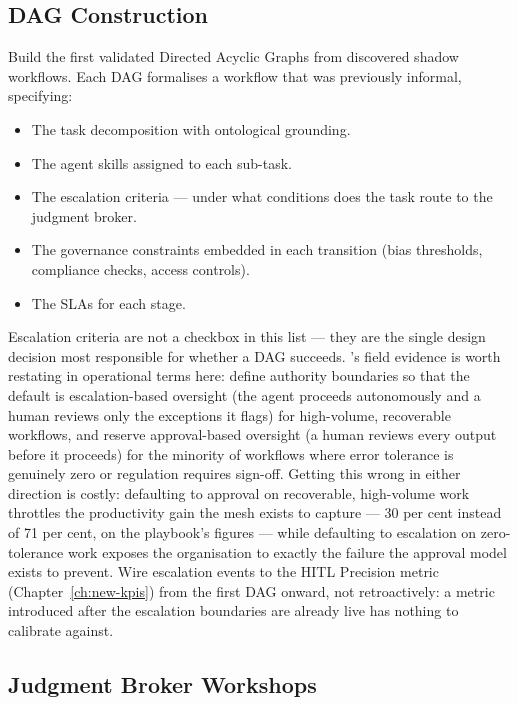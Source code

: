 \subsection{DAG Construction}

Build the first validated Directed Acyclic Graphs from discovered shadow workflows. Each DAG formalises a workflow that was previously informal, specifying:

\begin{itemize}
  \item The task decomposition with ontological grounding.
  \item The agent skills assigned to each sub-task.
  \item The escalation criteria --- under what conditions does the task route to the judgment broker.
  \item The governance constraints embedded in each transition (bias thresholds, compliance checks, access controls).
  \item The SLAs for each stage.
\end{itemize}

Escalation criteria are not a checkbox in this list --- they are the single design decision most responsible for whether a DAG succeeds. \textcite{Pereira2026Playbook}'s field evidence is worth restating in operational terms here: define authority boundaries so that the default is escalation-based oversight (the agent proceeds autonomously and a human reviews only the exceptions it flags) for high-volume, recoverable workflows, and reserve approval-based oversight (a human reviews every output before it proceeds) for the minority of workflows where error tolerance is genuinely zero or regulation requires sign-off. Getting this wrong in either direction is costly: defaulting to approval on recoverable, high-volume work throttles the productivity gain the mesh exists to capture --- 30 per cent instead of 71 per cent, on the playbook's figures --- while defaulting to escalation on zero-tolerance work exposes the organisation to exactly the failure the approval model exists to prevent. Wire escalation events to the HITL Precision metric (Chapter~\ref{ch:new-kpis}) from the first DAG onward, not retroactively: a metric introduced after the escalation boundaries are already live has nothing to calibrate against.

\subsection{Judgment Broker Workshops}

